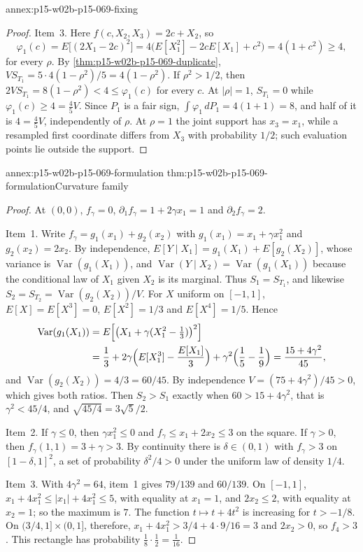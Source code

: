 \begin{annexitem}{annex:p15-w02b-p15-069-fixing}
\begin{proof}
Item~3. Here \(f(c,X_2,X_3)=2c+X_2\), so
\[
 \varphi_1(c)=E\bigl[(2X_1-2c)^2\bigr]
 =4\bigl(E[X_1^2]-2cE[X_1]+c^2\bigr)=4(1+c^2)\geq4,
\]
for every \(\rho\). By \cref{thm:p15-w02b-p15-069-duplicate},
\(VS_{T_1}=5\cdot4(1-\rho^2)/5=4(1-\rho^2)\). If \(\rho^2>1/2\), then
\(2VS_{T_1}=8(1-\rho^2)<4\leq\varphi_1(c)\) for every \(c\). At
\(|\rho|=1\), \(S_{T_1}=0\) while \(\varphi_1(c)\geq4=\tfrac45V\). Since
\(P_1\) is a fair sign, \(\int\varphi_1\,dP_1=4(1+1)=8\), and half of it is
\(4=\tfrac45V\), independently of \(\rho\). At \(\rho=1\) the joint support
has \(x_3=x_1\), while a resampled first coordinate differs from \(X_3\)
with probability \(1/2\); such evaluation points lie outside the support.
\end{proof}
\end{annexitem}

\begin{annexitem}{annex:p15-w02b-p15-069-formulation}
 {thm:p15-w02b-p15-069-formulation}{Curvature family}
\begin{proof}
At \((0,0)\), \(f_\gamma=0\), \(\partial_1f_\gamma=1+2\gamma x_1=1\) and
\(\partial_2f_\gamma=2\).

Item~1. Write \(f_\gamma=g_1(x_1)+g_2(x_2)\) with
\(g_1(x_1)=x_1+\gamma x_1^2\) and \(g_2(x_2)=2x_2\). By independence,
\(E[Y\mid X_1]=g_1(X_1)+E[g_2(X_2)]\), whose variance is
\(\operatorname{Var}(g_1(X_1))\), and
\(\operatorname{Var}(Y\mid X_2)=\operatorname{Var}(g_1(X_1))\) because
the conditional law of \(X_1\) given \(X_2\) is its marginal. Thus
\(S_1=S_{T_1}\), and likewise \(S_2=S_{T_2}=\operatorname{Var}(g_2(X_2))/V\).
For \(X\) uniform on \([-1,1]\),
\(E[X]=E[X^3]=0\), \(E[X^2]=1/3\) and \(E[X^4]=1/5\). Hence
\[
\begin{split}
 \operatorname{Var}(g_1(X_1))
 &=E\Bigl[\bigl(X_1+\gamma(X_1^2-\tfrac13)\bigr)^2\Bigr]\\
 &=\frac13+2\gamma\Bigl(E[X_1^3]-\frac{E[X_1]}3\Bigr)
  +\gamma^2\Bigl(\frac15-\frac19\Bigr)
 =\frac{15+4\gamma^2}{45},
\end{split}
\]
and \(\operatorname{Var}(g_2(X_2))=4/3=60/45\). By independence
\(V=(75+4\gamma^2)/45>0\), which gives both ratios. Then \(S_2>S_1\) exactly
when \(60>15+4\gamma^2\), that is \(\gamma^2<45/4\), and
\(\sqrt{45/4}=3\sqrt5/2\).

Item~2. If \(\gamma\leq0\), then \(\gamma x_1^2\leq0\) and
\(f_\gamma\leq x_1+2x_2\leq3\) on the square. If \(\gamma>0\), then
\(f_\gamma(1,1)=3+\gamma>3\). By continuity there is \(\delta\in(0,1)\) with
\(f_\gamma>3\) on \([1-\delta,1]^2\), a set of probability \(\delta^2/4>0\)
under the uniform law of density \(1/4\).

Item~3. With \(4\gamma^2=64\), item~1 gives \(79/139\) and \(60/139\).
On \([-1,1]\), \(x_1+4x_1^2\leq|x_1|+4x_1^2\leq5\), with equality at
\(x_1=1\), and \(2x_2\leq2\), with equality at \(x_2=1\); so the maximum
is \(7\). The function \(t\mapsto t+4t^2\) is increasing for \(t>-1/8\).
On \((3/4,1]\times(0,1]\), therefore,
\(x_1+4x_1^2>3/4+4\cdot9/16=3\) and \(2x_2>0\), so \(f_4>3\). This
rectangle has probability \(\tfrac18\cdot\tfrac12=\tfrac1{16}\).
\end{proof}
\end{annexitem}
